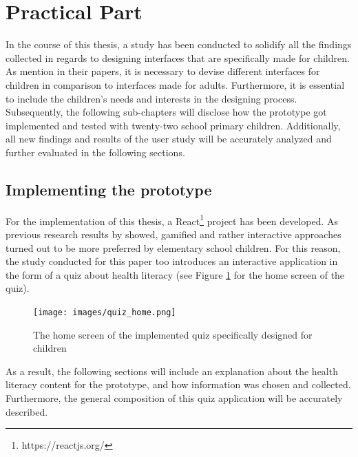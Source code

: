 \section{Practical Part}
\label{section:PracticalPart}
In the course of this thesis, a study has been conducted to solidify all the findings collected in regards to designing interfaces that are specifically made for children. As \textcite{gossen2012search, engen2014ipads, lozano2016dedigitalizing} mention in their papers, it is necessary to devise different interfaces for children in comparison to interfaces made for adults. Furthermore, it is essential to include the children's needs and interests in the designing process.\\
Subsequently, the following sub-chapters will disclose how the prototype got implemented and tested with twenty-two school primary children. Additionally, all new findings and results of the user study will be accurately analyzed and further evaluated in the following sections. 

\subsection{Implementing the prototype}
\label{subsection:ImplementingPrototype}
For the implementation of this thesis, a React\footnote{https://reactjs.org/} project has been developed. As previous research results by \textcite{gossen2012search, lozano2016dedigitalizing} showed, gamified and rather interactive approaches turned out to be more preferred by elementary school children. For this reason, the study conducted for this paper too introduces an interactive application in the form of a quiz about health literacy (see Figure \ref{figure:QuizHome} for the home screen of the quiz). 
\begin{figure}[!ht]
    \centering
    \texttt{[image: images/quiz\_home.png]}
    \caption{
        The home screen of the implemented quiz specifically designed for children
    }
    \label{figure:QuizHome}
\end{figure}
As a result, the following sections will include an explanation about the health literacy content for the prototype, and how information was chosen and collected. Furthermore, the general composition of this quiz application will be accurately described.

